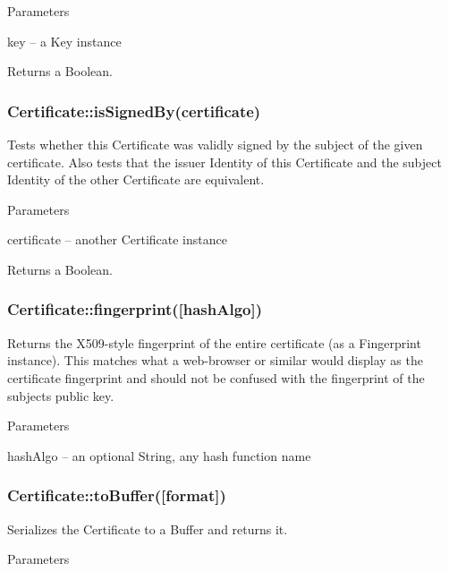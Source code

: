Parameters


\begin{DoxyItemize}
\item {\ttfamily key} -- a Key instance
\end{DoxyItemize}

Returns a Boolean.

\subsubsection*{{\ttfamily Certificate\+::is\+Signed\+By(certificate)}}

Tests whether this Certificate was validly signed by the subject of the given certificate. Also tests that the issuer Identity of this Certificate and the subject Identity of the other Certificate are equivalent.

Parameters


\begin{DoxyItemize}
\item {\ttfamily certificate} -- another Certificate instance
\end{DoxyItemize}

Returns a Boolean.

\subsubsection*{{\ttfamily Certificate\+::fingerprint(\mbox{[}hash\+Algo\mbox{]})}}

Returns the X509-\/style fingerprint of the entire certificate (as a Fingerprint instance). This matches what a web-\/browser or similar would display as the certificate fingerprint and should not be confused with the fingerprint of the subject\textquotesingle{}s public key.

Parameters


\begin{DoxyItemize}
\item {\ttfamily hash\+Algo} -- an optional String, any hash function name
\end{DoxyItemize}

\subsubsection*{{\ttfamily Certificate\+::to\+Buffer(\mbox{[}format\mbox{]})}}

Serializes the Certificate to a Buffer and returns it.

Parameters


